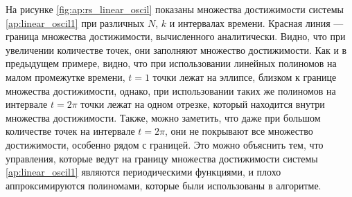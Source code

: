 \documentclass[../main.tex]{subfiles}
\begin{document}
  На рисунке \ref{fig:ap:rs_linear_oscil} показаны множества достижимости системы \eqref{ap:linear_oscil1} при различных $N$, $k$ и интервалах времени.
  Красная линия --- граница множества достижимости, вычисленного аналитически.
  Видно, что при увеличении количестве точек, они заполняют множество достижимости.
  Как и в предыдущем примере, видно, что при использовании линейных полиномов на малом промежутке времени, $t = 1$ точки лежат на эллипсе, близком к границе множества достижимости, однако, при использовании таких же полиномов на интервале $t = 2\pi$ точки лежат на одном отрезке, который находится внутри множества достижимости. 
  Также, можно заметить, что даже при большом количестве точек на интервале  $t = 2\pi$, они не покрывают все множество достижимости, особенно рядом с границей.
  Это можно объяснить тем, что управления, которые ведут на границу множества достижимости системы  \eqref{ap:linear_oscil1} являются периодическими функциями, и плохо аппроксимируются полиномами, которые были использованы в алгоритме.
  
\end{document}
